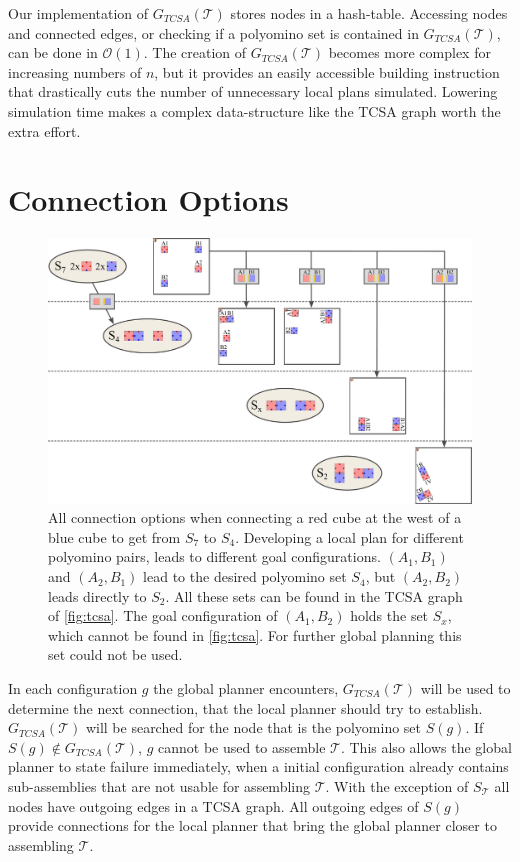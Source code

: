 Our implementation of $G_{\textit{TCSA}}(\mathcal{T})$ stores nodes in a hash-table.
Accessing nodes and connected edges, or checking if a polyomino set is contained in $G_{\textit{TCSA}}(\mathcal{T})$, can be done in  $\mathcal{O}(1)$.
The creation of $G_{\textit{TCSA}}(\mathcal{T})$ becomes more complex for increasing numbers of $n$, but it provides an easily accessible building instruction that drastically cuts the number of unnecessary local plans simulated.
Lowering simulation time makes a complex data-structure like the TCSA graph worth the extra effort.


\section{Connection Options}
\label{sec:connect_options}

\begin{figure}
	\centering
	\includegraphics[width=1\textwidth]{figures/connect_options.pdf}
	\caption[Example of connection options for one two-cut-sub-assembly edge]{All connection options when connecting a red cube at the west of a blue cube to get from $S_7$ to $S_4$. Developing a local plan for different polyomino pairs, leads to different goal configurations. $(A_1,B_1)$ and $(A_2,B_1)$ lead to the desired polyomino set $S_4$, but $(A_2,B_2)$ leads directly to $S_2$. All these sets can be found in the TCSA graph of \autoref{fig:tcsa}. The goal configuration of $(A_1, B_2)$ holds the set $S_x$, which cannot be found in \autoref{fig:tcsa}. For further global planning this set could not be used.}
	\label{fig:connect_options}
\end{figure}

In each configuration $g$ the global planner encounters, $G_{\textit{TCSA}}(\mathcal{T})$ will be used to determine the next connection, that the local planner should try to establish.
$G_{\textit{TCSA}}(\mathcal{T})$ will be searched for the node that is the polyomino set $S(g)$.
If $S(g) \notin G_{\textit{TCSA}}(\mathcal{T})$, $g$ cannot be used to assemble $\mathcal{T}$.
This also allows the global planner to state failure immediately, when a initial configuration already contains sub-assemblies that are not usable for assembling $\mathcal{T}$.
With the exception of $S_\mathcal{T}$ all nodes have outgoing edges in a TCSA graph.
All outgoing edges of $S(g)$ provide connections for the local planner that bring the global planner closer to assembling $\mathcal{T}$.

